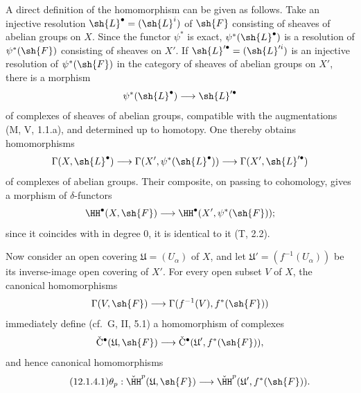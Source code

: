 \begin{env}[12.1.4]
\label{0.12.1.4}
A direct definition of the homomorphism  can be
given as follows.
Take an injective resolution
$\sh{L}^\bullet=(\sh{L}^i)$ of $\sh{F}$ consisting of sheaves of
abelian groups on $X$.
Since the functor $\psi^*$ is exact,
$\psi^*(\sh{L}^\bullet)$ is a resolution of $\psi^*(\sh{F})$
consisting of sheaves on $X'$.
If $\sh{L}'^\bullet=(\sh{L}'^i)$ is an injective resolution of
$\psi^*(\sh{F})$ in the category of sheaves of abelian groups on
$X'$, there is a morphism
\[
  \psi^*(\sh{L}^\bullet)\longrightarrow\sh{L}'^\bullet
\]
of complexes of sheaves of abelian groups, compatible with the
augmentations (M, V, 1.1.a), and determined up to homotopy.
One thereby obtains homomorphisms
\[
  \Gamma(X,\sh{L}^\bullet)
  \longrightarrow
  \Gamma(X',\psi^*(\sh{L}^\bullet))
  \longrightarrow
  \Gamma(X',\sh{L}'^\bullet)
\]
of complexes of abelian groups.
Their composite, on passing to cohomology, gives a morphism of
$\delta$-functors
\[
  \HH^\bullet(X,\sh{F})
  \longrightarrow
  \HH^\bullet(X',\psi^*(\sh{F}));
\]
since it coincides with  in degree $0$, it is
identical to it (T, 2.2).

Now consider an open covering
$\mathfrak{U}=(U_\alpha)$ of $X$, and let
$\mathfrak{U}'=(f^{-1}(U_\alpha))$ be its inverse-image open covering
of $X'$.
For every open subset $V$ of $X$, the canonical homomorphisms
\[
  \Gamma(V,\sh{F})
  \longrightarrow
  \Gamma(f^{-1}(V),f^*(\sh{F}))
\]
immediately define (cf.\ G, II, 5.1) a homomorphism of complexes
\[
  \check{\mathrm{C}}^\bullet(\mathfrak{U},\sh{F})
  \longrightarrow
  \check{\mathrm{C}}^\bullet(\mathfrak{U}',f^*(\sh{F})),
\]
and hence canonical homomorphisms
\[
\label{0.12.1.4.1}
\tag{12.1.4.1}
  \theta_p:
  \check{\HH}^p(\mathfrak{U},\sh{F})
  \longrightarrow
  \check{\HH}^p(\mathfrak{U}',f^*(\sh{F})).
\]


\end{env}
